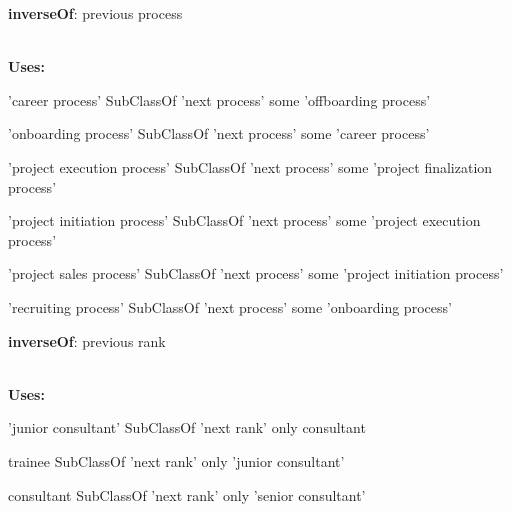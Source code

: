 \documentclass[a4paper, DIV=13, BCOR=0cm]{scrbook}
\begin{document}
\begin{mdframed}[style=onto, frametitle={next process}]
	{%
		\begin{compactitem}
			\item \textbf{inverseOf}: previous process
		\end{compactitem}
		\hrulefill\\
		\textbf{Uses:}
		\begin{compactitem}
			\item 'career process' SubClassOf 'next process' some 'offboarding process'
			\item 'onboarding process' SubClassOf 'next process' some 'career process'
			\item 'project execution process' SubClassOf 'next process' some 'project finalization process'
			\item 'project initiation process' SubClassOf 'next process' some 'project execution process'
			\item 'project sales process' SubClassOf 'next process' some 'project initiation process'
			\item 'recruiting process' SubClassOf 'next process' some 'onboarding process'
		\end{compactitem}
	} %
\end{mdframed}

\begin{mdframed}[style=onto, frametitle={next rank}]
	{%
		\begin{compactitem}
			\item \textbf{inverseOf}: previous rank
		\end{compactitem}
		\hrulefill\\
		\textbf{Uses:}
		\begin{compactitem}
			\item 'junior consultant' SubClassOf 'next rank' only consultant
			\item trainee SubClassOf 'next rank' only 'junior consultant'
			\item consultant SubClassOf 'next rank' only 'senior consultant'
		\end{compactitem}
	} %
\end{mdframed}
\end{document}
